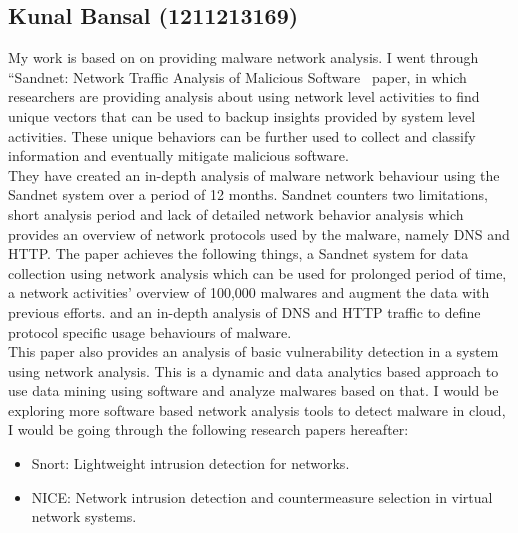 \documentclass[11pt]{article}
\begin{document}
		\subsection{Kunal Bansal (1211213169)}
		My work is based on on providing malware network analysis. I went through “Sandnet: Network Traffic Analysis of Malicious Software~\cite{rossow2011sandnet} paper, in which researchers are providing analysis about using network level activities to find unique vectors that can be used to backup insights provided by system level activities. These unique behaviors can be further used to collect and classify information and eventually mitigate malicious software.\\
		They have created an in-depth analysis of malware network behaviour using the Sandnet system over a period of 12 months. Sandnet counters two limitations, short analysis period and lack of detailed network behavior analysis which provides an overview of network protocols used by the malware, namely DNS and HTTP. The paper achieves the following things, a Sandnet system for data collection using network analysis which can be used for prolonged period of time, a network activities’ overview of 100,000 malwares and augment the data with previous efforts.
		and an in-depth analysis of DNS and HTTP traffic to define protocol specific usage behaviours of malware.\\
		This paper also provides an analysis of basic vulnerability detection in a system using network analysis. This is a dynamic and data analytics based approach to use data mining using software and analyze malwares based on that. I would be exploring more software based network analysis tools to detect malware in cloud, I would be going through the following research papers hereafter:
		\begin{itemize}[noitemsep]
			\item Snort: Lightweight intrusion detection for networks.~\cite{roesch1999snort}
			\item NICE: Network intrusion detection and countermeasure selection in virtual network systems.~\cite{chung2013nice}
		\end{itemize}
\end{document}
